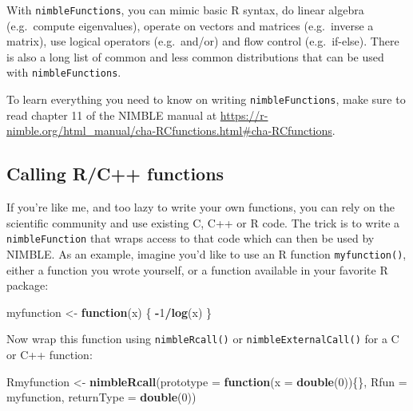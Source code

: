 \documentclass[
  12pt,
]{krantz}
\newenvironment{Shaded}{\begin{snugshade}}{\end{snugshade}}
\newcommand{\AttributeTok}[1]{\textcolor[rgb]{0.13,0.29,0.53}{#1}}
\newcommand{\ControlFlowTok}[1]{\textcolor[rgb]{0.13,0.29,0.53}{\textbf{#1}}}
\newcommand{\DecValTok}[1]{\textcolor[rgb]{0.00,0.00,0.81}{#1}}
\newcommand{\FunctionTok}[1]{\textcolor[rgb]{0.13,0.29,0.53}{\textbf{#1}}}
\newcommand{\NormalTok}[1]{#1}
\newcommand{\OtherTok}[1]{\textcolor[rgb]{0.56,0.35,0.01}{#1}}
\newcommand{\SpecialCharTok}[1]{\textcolor[rgb]{0.81,0.36,0.00}{\textbf{#1}}}
\newcommand{\StringTok}[1]{\textcolor[rgb]{0.31,0.60,0.02}{#1}}
\begin{document}
With \texttt{nimbleFunctions}, you can mimic basic R syntax, do linear algebra (e.g.~compute eigenvalues), operate on vectors and matrices (e.g.~inverse a matrix), use logical operators (e.g.~and/or) and flow control (e.g.~if-else). There is also a long list of common and less common distributions that can be used with \texttt{nimbleFunctions}.

To learn everything you need to know on writing \texttt{nimbleFunctions}, make sure to read chapter 11 of the NIMBLE manual at \url{https://r-nimble.org/html_manual/cha-RCfunctions.html\#cha-RCfunctions}.

\hypertarget{callrfninnimble}{%
\subsection{Calling R/C++ functions}\label{callrfninnimble}}

If you're like me, and too lazy to write your own functions, you can rely on the scientific community and use existing C, C++ or R code. The trick is to write a \texttt{nimbleFunction} that wraps access to that code which can then be used by NIMBLE. As an example, imagine you'd like to use an R function \texttt{myfunction()}, either a function you wrote yourself, or a function available in your favorite R package:

\begin{Shaded}
\begin{Highlighting}[]
\NormalTok{myfunction }\OtherTok{\textless{}{-}} \ControlFlowTok{function}\NormalTok{(x) \{}
  \SpecialCharTok{{-}}\DecValTok{1}\SpecialCharTok{/}\FunctionTok{log}\NormalTok{(x)}
\NormalTok{\}}
\end{Highlighting}
\end{Shaded}

Now wrap this function using \texttt{nimbleRcall()} or \texttt{nimbleExternalCall()} for a C or C++ function:

\begin{Shaded}
\begin{Highlighting}[]
\NormalTok{Rmyfunction }\OtherTok{\textless{}{-}} \FunctionTok{nimbleRcall}\NormalTok{(}\AttributeTok{prototype =} \ControlFlowTok{function}\NormalTok{(}\AttributeTok{x =} \FunctionTok{double}\NormalTok{(}\DecValTok{0}\NormalTok{))\{\}, }
                           \AttributeTok{Rfun =} \StringTok{\textquotesingle{}myfunction\textquotesingle{}}\NormalTok{,}
                           \AttributeTok{returnType =} \FunctionTok{double}\NormalTok{(}\DecValTok{0}\NormalTok{))}
\end{Highlighting}
\end{Shaded}
\end{document}

